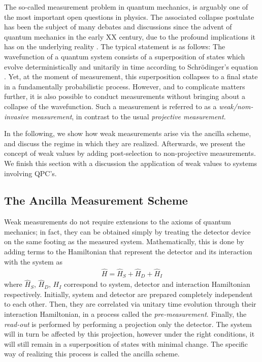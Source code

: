 \documentclass{article}
\begin{document}
The so-called measurement problem in quantum mechanics, is arguably one of the most important open questions
in physics. The associated collapse 
postulate has been the subject of many debates and discussions since the advent of quantum mechanics in the early XX century, 
due to the profound implications it has on the underlying reality \cite{bellsocks1981}. 
The typical statement is as follows: The
wavefunction of a quantum system consists of a 
superposition of states which evolve deterministically 
and unitarily in time according to Schrödinger's 
equation \cite{schrodingerQuantisierung1926,heisenbergUeberQuanten1985}. Yet, at the 
moment of measurement, this superposition collapses to a final state in a fundamentally 
probabilistic process. However, and to complicate
matters further, it is also possible to conduct measurements without bringing about 
a collapse of the wavefunction. Such a measurement is referred to as a \textit{weak/nom-invasive measurement}, in contrast to the usual \textit{projective measurement}.

In the following, we show how weak measurements arise via the ancilla scheme, and discuss the regime
in which they are realized. Afterwards, we present the concept of weak values by adding 
post-selection to non-projective measurements. We finish this 
section with a discussion the application of weak values to systems involving QPC's.

\subsection{The Ancilla Measurement Scheme}

Weak measurements do not require extensions to the axioms of quantum mechanics; in fact, they can be obtained simply by treating the detector device on the same footing as the measured system. Mathematically, this is done by adding terms to the Hamiltonian that represent the detector and its interaction with the system as 
\begin{align}
 \hat{H} = \hat{H}_S + \hat{H}_D + \hat{H}_{I}
\end{align}
where $\hat{H}_S $, $\hat{H}_D $, $ H_{I}$ correspond to system, detector and interaction Hamiltonian respectively. 
Initially, system and detector are prepared completely independent to each other. Then, they are correlated via unitary 
time evolution through their interaction Hamiltonian, in a process called the \textit{pre-measurement}. Finally, the \textit{read-out} is performed by performing a 
projection only the detector. The system will in turn be affected 
by this projection, however under the right conditions, it will still remain in a superposition of states with minimal change.
The specific way of realizing this process is called the ancilla scheme. 
\end{document}
